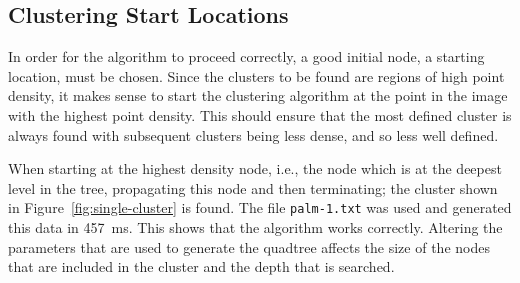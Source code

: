 \subsection{Clustering Start Locations}
\label{sub:clustering_start_locations}

In order for the algorithm to proceed correctly, a good initial node, a
starting location, must be chosen. Since the clusters to be found are regions
of high point density, it makes sense to start the clustering algorithm at the
point in the image with the highest point density. This should ensure that the
most defined cluster is always found with subsequent clusters being less dense,
and so less well defined.

When starting at the highest density node, i.e., the node which is at the
deepest level in the tree, propagating this node and then terminating; the
cluster shown in Figure~\ref{fig:single-cluster} is found. The file
\texttt{palm-1.txt} was used and generated this data in
\SI{457}{\milli\second}. This shows that the algorithm works correctly.
Altering the parameters that are used to generate the quadtree affects the size
of the nodes that are included in the cluster and the depth that is searched.

